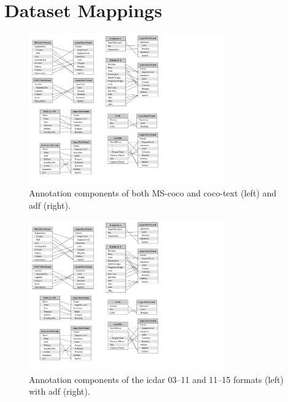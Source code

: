\chapter{Dataset Mappings}
\label{ch:dataset_mappings}

\begin{figure}[p]
  \centering
  \includegraphics[width=0.75\textwidth]{images/dataset/mapping/coco_format}
  \caption[Mapping ADF to COCO-based annotation formats]{Annotation components of both MS-\gls{coco} and \gls{coco}-text (left) and \gls{adf} (right).}
  \label{fig:dataset:metamodel_evaluation:mapping:coco}
\end{figure}

\begin{figure}[p]
  \centering
  \includegraphics[width=0.75\textwidth]{images/dataset/mapping/icdar_format}
  \caption[Mapping the ICDAR annotation formats to ADF]{Annotation components of the \gls{icdar} 03--11 and 11--15 formats (left) with \gls{adf} (right).}
  \label{fig:dataset:metamodel_evaluation:mapping:icdar}
\end{figure}

